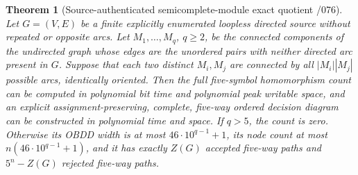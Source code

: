 \documentclass[11pt]{article}
\newtheorem{theorem}{Theorem}
\begin{document}
\begin{theorem}[Source-authenticated semicomplete-module exact quotient /076]
Let $G=(V,E)$ be a finite explicitly enumerated loopless directed source
without repeated or opposite arcs. Let $M_1,\ldots,M_q$, $q\ge2$, be the
connected components of the undirected graph whose edges are the unordered
pairs with neither directed arc present in $G$.
Suppose that each two distinct $M_i,M_j$ are connected by all
$|M_i||M_j|$ possible arcs, identically oriented.
Then the full five-symbol homomorphism count can be computed in polynomial
bit time and polynomial peak writable space, and an explicit
assignment-preserving, complete, five-way \emph{ordered} decision diagram
can be constructed in polynomial time and space.
If $q>5$, the count is zero. Otherwise its OBDD width is at most
$46\cdot10^{q-1}+1$, its node count at most
$n(46\cdot10^{q-1}+1)$, and it has exactly $Z(G)$ accepted
five-way paths and $5^n-Z(G)$ rejected five-way paths.
\end{theorem}
\end{document}
